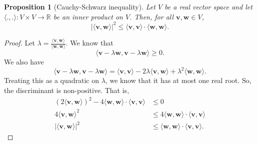\documentclass[a4paper, openany]{memoir}
\theoremstyle{definition}
\theoremstyle{plain}
\newtheorem{proposition}[definition]{Proposition}
\begin{document}
\begin{proposition}[Cauchy-Schwarz inequality]
    Let $V$ be a real vector space and let $\langle ., . \rangle: V \times V \to \mathbb{R}$ be an inner product on $V$. Then, for all $\bm{v}, \bm{w} \in V$,
    \[|\langle \bm{v}, \bm{w} \rangle|^2 \leq \langle \bm{v}, \bm{v} \rangle \cdot \langle \bm{w}, \bm{w} \rangle.\]
\end{proposition}
\begin{proof}
    Let $\lambda = \frac{\langle \bm{v}, \bm{w} \rangle}{\langle \bm{w}, \bm{w} \rangle}$. We know that
    \[\langle \bm{v} - \lambda \bm{w}, \bm{v} - \lambda \bm{w} \rangle \geq 0.\]
    We also have
    \[\langle \bm{v} - \lambda \bm{w}, \bm{v} - \lambda \bm{w} \rangle = \langle \bm{v}, \bm{v} \rangle - 2\lambda \langle \bm{v}, \bm{w} \rangle + \lambda^2 \langle \bm{w}, \bm{w} \rangle.\]
    Treating this as a quadratic on $\lambda$, we know that it has at most one real root. So, the discriminant is non-positive. That is,
    \begin{align*}
        (2\langle \bm{v}, \bm{w} \rangle)^2 - 4\langle \bm{w}, \bm{w} \rangle \cdot \langle \bm{v}, \bm{v} \rangle &\leq 0 \\
        4\langle \bm{v}, \bm{w} \rangle^2 &\leq 4\langle \bm{w}, \bm{w} \rangle \cdot \langle \bm{v}, \bm{v} \rangle \\
        |\langle \bm{v}, \bm{w} \rangle|^2 &\leq \langle \bm{w}, \bm{w} \rangle \cdot \langle \bm{v}, \bm{v} \rangle.
    \end{align*}
\end{proof}
\end{document}
